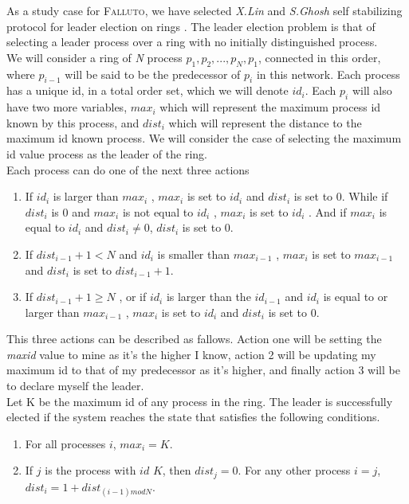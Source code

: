\documentclass[12pt]{llncs2e/llncs}
\newcommand{\falluto}{\mbox{\textsc{Falluto}}}
\begin{document}
As a study case for \falluto, we have selected \textit{X.Lin} and \textit{S.Ghosh} self stabilizing protocol for leader election on rings \cite{linghosh, ghoshgupta, yokogawa, hammes}. The leader election problem is that of selecting a leader process over a ring with no initially distinguished process.\\
We will consider a ring of \textit{N} process $p_1,p_2,...,p_N,p_1$, connected in this order, where $p_{i-1}$ will be said to be the predecessor of $p_i$ in this network. Each process has a unique id, in a total order set, which we will denote $id_i$. Each $p_i$ will also have two more variables, $max_i$ which will represent the maximum process id known by this process, and $dist_i$ which will represent the distance to the maximum id known process. We will consider the case of selecting the maximum id value process as the leader of the ring.\\
Each process can do one of the next three actions
\begin{enumerate}
\item If $id_i$ is larger than $max_i$ , $max_i$ is set to $id_i$ and $dist_i$ is set to $0$. While if $dist_i$ is $0$ and $max_i$ is not equal to $id_i$ , $max_i$ is set to $id_i$ . And if $max_i$ is equal to $id_i$ and $dist_i \neq 0$, $dist_i$ is set to $0$.

\item If $dist_{i-1} + 1 < N$ and $id_i$ is smaller than $max_{i-1}$ , $max_i$ is set to $max_{i-1}$ and $dist_i$ is set to $dist_{i-1} + 1$.

\item If $dist_{i-1} + 1 \geq N$ , or if $id_i$ is larger than the $id_{i-1}$ and $id_i$ is equal to or larger than $max_{i-1}$ , $max_i$ is set to $id_i$ and $dist_i$ is set to $0$.
\end{enumerate}
This three actions can be described as fallows. Action one will be setting the \textit{maxid} value to mine as it's the higher I know, action 2 will be updating my maximum id to that of my predecessor as it's higher, and finally action 3 will be to declare myself the leader.\\
Let K be the maximum id of any process in the ring. The leader is successfully elected if the system reaches the state that satisfies the following conditions.
\begin{enumerate}
\item For all processes $i$, $max_i = K$.

\item If $j$ is the process with $id$ $K$, then $dist_j = 0$. For any other process $i = j$, $dist_i =
1 + dist_{(i-1) mod N}$.
\end{enumerate}
\end{document}
